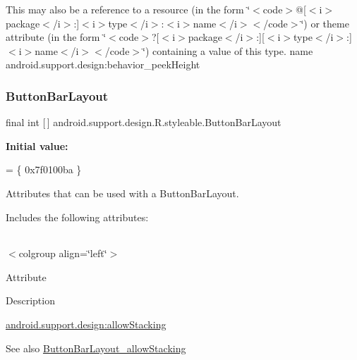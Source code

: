 This may also be a reference to a resource (in the form \char`\"{}$<$code$>$@\mbox{[}$<$i$>$package$<$/i$>$\+:\mbox{]}$<$i$>$type$<$/i$>$\+:$<$i$>$name$<$/i$>$$<$/code$>$\char`\"{}) or theme attribute (in the form \char`\"{}$<$code$>$?\mbox{[}$<$i$>$package$<$/i$>$\+:\mbox{]}\mbox{[}$<$i$>$type$<$/i$>$\+:\mbox{]}$<$i$>$name$<$/i$>$$<$/code$>$\char`\"{}) containing a value of this type.  name android.\+support.\+design\+:behavior\+\_\+peek\+Height \mbox{\label{classandroid_1_1support_1_1design_1_1R_1_1styleable_a4f0d1f5f070f55c0bbcd76e065dda963}} 
\subsubsection{\texorpdfstring{Button\+Bar\+Layout}{ButtonBarLayout}}
{\footnotesize\ttfamily final int \mbox{[}$\,$\mbox{]} android.\+support.\+design.\+R.\+styleable.\+Button\+Bar\+Layout\hspace{0.3cm}{\ttfamily [static]}}

{\bfseries Initial value\+:}
\begin{DoxyCode}
= \{
            0x7f0100ba
        \}
\end{DoxyCode}
Attributes that can be used with a Button\+Bar\+Layout. 

Includes the following attributes\+:

\tabulinesep=1mm
\begin{longtabu} spread 0pt [c]{*{0}{|X[-1]}|}
\hline
\end{longtabu}
$<$colgroup align=\char`\"{}left\char`\"{}$>$ 

Attribute

Description 

{\ttfamily \hyperlink{classandroid_1_1support_1_1design_1_1R_1_1styleable_a0ccf3237d7fd785321610e6dcf8584ea}{android.\+support.\+design\+:allow\+Stacking}}

\begin{DoxySeeAlso}{See also}
\hyperlink{classandroid_1_1support_1_1design_1_1R_1_1styleable_a0ccf3237d7fd785321610e6dcf8584ea}{Button\+Bar\+Layout\+\_\+allow\+Stacking} 
\end{DoxySeeAlso}
\mbox{\label{classandroid_1_1support_1_1design_1_1R_1_1styleable_a0ccf3237d7fd785321610e6dcf8584ea}} 
